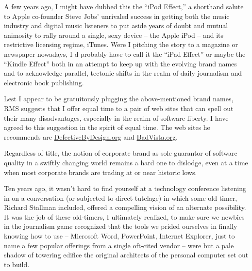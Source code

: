 \ifdefined\chs

\fi

\ifdefined\eng
A few years ago, I might have dubbed this the ``iPod Effect,'' a
shorthand salute to Apple co-founder Steve Jobs' unrivaled success in
getting both the music industry and digital music listeners to put
aside years of doubt and mutual animosity to rally around a single,
sexy device -- the Apple iPod -- and its restrictive licensing regime,
iTunes. Were I pitching the story to a magazine or newspaper nowadays,
I d probably have to call it the ``iPad Effect'' or maybe the ``Kindle
Effect'' both in an attempt to keep up with the evolving brand names
and to acknowledge parallel, tectonic shifts in the realm of daily
journalism and electronic book publishing.
\fi

\ifdefined\chs

\fi

\ifdefined\eng
Lest I appear to be gratuitously plugging the above-mentioned brand
names, RMS suggests that I offer equal time to a pair of web sites that
can spell out their many disadvantages, especially in the realm of
software liberty. I have agreed to this suggestion in the spirit of
equal time. The web sites he recommends are \url{DefectiveByDesign.org}
and \url{BadVista.org}.
\fi

\ifdefined\chs

\fi

\ifdefined\eng
Regardless of title, the notion of corporate brand as sole guarantor  
of software quality in a swiftly changing world remains a hard one to  
dislodge, even at a time when most corporate brands are trading at or  
near historic lows.
\fi

\ifdefined\chs

\fi

\ifdefined\eng
Ten years ago, it wasn't hard to find yourself at a technology
conference listening in on a conversation (or subjected to direct
tutelage) in which some old-timer, Richard Stallman included, offered
a compelling vision of an alternate possibility. It was the job of
these old-timers, I ultimately realized, to make sure we newbies in
the journalism game recognized that the tools we prided ourselves in
finally knowing how to use -- Microsoft Word, PowerPoint, Internet
Explorer, just to name a few popular offerings from a single oft-cited
vendor -- were but a pale shadow of towering edifice the original
architects of the personal computer set out to build.
\fi

\ifdefined\chs


